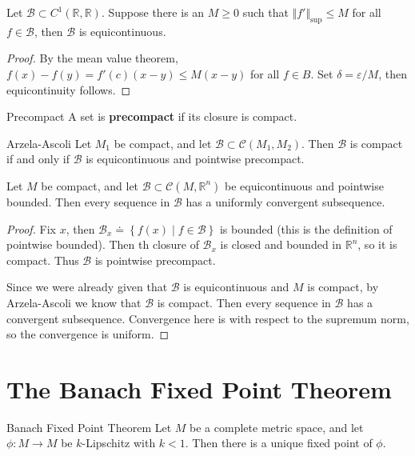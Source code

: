 \documentclass[twoside,10pt]{report}
\begin{document}
\begin{prop}
	Let $\mathcal{B} \subset C^1(\mathbb{R},\mathbb{R})$. Suppose there is an $M \geq 0$ such that $\Vert{f'}\Vert_{\sup} \leq M$ for all $f \in \mathcal{B}$, then $\mathcal{B}$ is equicontinuous.
\end{prop}
\begin{proof}
	By the mean value theorem, $f(x) - f(y) = f'(c) (x-y) \leq M (x-y)$ for all $f \in B$. Set $\delta = \varepsilon/M$, then equicontinuity follows.
\end{proof}

\begin{defn}{Precompact}{}
A set is \textbf{precompact} if its closure is compact.
\end{defn}

\begin{thrm}{Arzela-Ascoli}{}
	Let $M_1$ be compact, and let $\mathcal{B} \subset \mathcal{C}(M_1, M_2)$. Then $\mathcal{B}$ is compact if and only if $\mathcal{B}$ is equicontinuous and pointwise precompact.
\end{thrm}

\begin{cor}
	Let $M$ be compact, and let $\mathcal{B}\subset \mathcal{C}(M, \mathbb{R}^n)$ be equicontinuous and pointwise bounded. Then every sequence in $\mathcal{B}$ has a uniformly convergent subsequence.
\end{cor}
\begin{proof}
	Fix $x$, then $\mathcal{B}_x \doteq \left\{ f(x) \;|\; f \in \mathcal{B} \right\}$ is bounded (this is the definition of pointwise bounded). Then th closure of $\mathcal{B}_x $ is closed and bounded in $\mathbb{R}^n$, so it is compact. Thus $\mathcal{B}$ is pointwise precompact.

	Since we were already given that $\mathcal{B}$ is equicontinuous and $M$ is compact, by Arzela-Ascoli we know that $\mathcal{B}$ is compact. Then every sequence in $\mathcal{B}$ has a convergent subsequence. Convergence here is with respect to the supremum norm, so the convergence is uniform.
\end{proof}



\section{The Banach Fixed Point Theorem}

\begin{thrm}{Banach Fixed Point Theorem}{}
	Let $M$ be a complete metric space, and let $\phi:M \to M$ be $k$-Lipschitz with $k < 1$. Then there is a unique fixed point of $\phi$.
\end{thrm}
\end{document}

